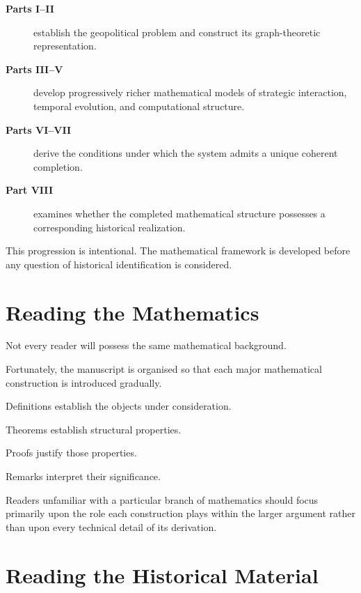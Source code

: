 \documentclass[11pt,openany]{book}
\theoremstyle{plain}
\theoremstyle{definition}
\begin{document}
\begin{description}

\item[\textbf{Parts I--II}]
establish the geopolitical problem and construct its graph-theoretic representation.

\item[\textbf{Parts III--V}]
develop progressively richer mathematical models of strategic interaction, temporal evolution, and computational structure.

\item[\textbf{Parts VI--VII}]
derive the conditions under which the system admits a unique coherent completion.

\item[\textbf{Part VIII}]
examines whether the completed mathematical structure possesses a corresponding historical realization.

\end{description}

This progression is intentional. The mathematical framework is developed before any question of historical identification is considered.


\section*{Reading the Mathematics}

Not every reader will possess the same mathematical background.

Fortunately, the manuscript is organised so that each major mathematical construction is introduced gradually.

Definitions establish the objects under consideration.

Theorems establish structural properties.

Proofs justify those properties.

Remarks interpret their significance.

Readers unfamiliar with a particular branch of mathematics should focus primarily upon the role each construction plays within the larger argument rather than upon every technical detail of its derivation.


\section*{Reading the Historical Material}
\end{document}

